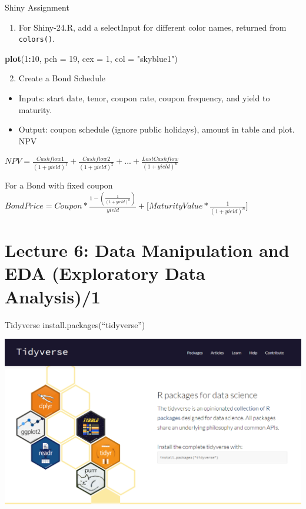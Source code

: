 \documentclass[
  10pt,
  ignorenonframetext,
  serif]{beamer}
\newenvironment{Shaded}{\begin{snugshade}}{\end{snugshade}}
\newcommand{\DataTypeTok}[1]{\textcolor[rgb]{0.13,0.29,0.53}{#1}}
\newcommand{\DecValTok}[1]{\textcolor[rgb]{0.00,0.00,0.81}{#1}}
\newcommand{\KeywordTok}[1]{\textcolor[rgb]{0.13,0.29,0.53}{\textbf{#1}}}
\newcommand{\NormalTok}[1]{#1}
\newcommand{\OperatorTok}[1]{\textcolor[rgb]{0.81,0.36,0.00}{\textbf{#1}}}
\newcommand{\StringTok}[1]{\textcolor[rgb]{0.31,0.60,0.02}{#1}}
\providecommand{\tightlist}{%
  \setlength{\itemsep}{0pt}\setlength{\parskip}{0pt}}
\begin{document}
\begin{frame}[fragile]{Shiny Assignment}
\protect\hypertarget{shiny-assignment}{}
\begin{enumerate}
\tightlist
\item
  For Shiny-24.R, add a selectInput for different color names, returned
  from \texttt{colors()}.
\end{enumerate}

\begin{Shaded}
\begin{Highlighting}[]
\KeywordTok{plot}\NormalTok{(}\DecValTok{1}\OperatorTok{:}\DecValTok{10}\NormalTok{, }\DataTypeTok{pch =} \DecValTok{19}\NormalTok{, }\DataTypeTok{cex =} \DecValTok{1}\NormalTok{, }\DataTypeTok{col =} \StringTok{"skyblue1"}\NormalTok{)}
\end{Highlighting}
\end{Shaded}

\begin{enumerate}
\setcounter{enumi}{1}
\tightlist
\item
  Create a Bond Schedule
\end{enumerate}

\begin{itemize}
\tightlist
\item
  Inputs: start date, tenor, coupon rate, coupon frequency, and yield to
  maturity.
\item
  Output: coupon schedule (ignore public holidays), amount in table and
  plot. NPV
\end{itemize}

\(NPV = \frac{Cashflow 1}{(1 + yield)^1} + \frac{Cashflow 2}{(1 + yield)^2} + ... + \frac{Last Cashflow}{(1 + yield)^n}\)

For a Bond with fixed coupon
\(Bond Price = Coupon * \frac{1 - (\frac{1}{(1 + yield)^n})}{yield} + \Big[MaturityValue * \frac{1}{(1 + yield)^n}\Big]\)
\end{frame}

\hypertarget{lecture-6-data-manipulation-and-eda-exploratory-data-analysis1}{%
\section{Lecture 6: Data Manipulation and EDA (Exploratory Data
Analysis)/1}\label{lecture-6-data-manipulation-and-eda-exploratory-data-analysis1}}

\begin{frame}{Tidyverse}
\protect\hypertarget{tidyverse}{}
install.packages(``tidyverse'')

\begin{center}\includegraphics[width=0.55\linewidth]{imgs/2017/tidyverse} \end{center}
\end{frame}
\end{document}
